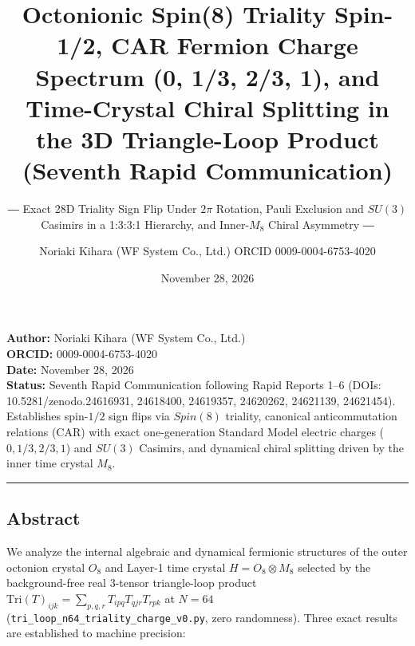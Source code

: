 \documentclass[
  a4paper,
]{article}
\title{Octonionic Spin(8) Triality Spin-1/2, CAR Fermion Charge Spectrum
(0, 1/3, 2/3, 1), and Time-Crystal Chiral Splitting in the 3D
Triangle-Loop Product (Seventh Rapid Communication)}
\subtitle{― Exact 28D Triality Sign Flip Under \(2\pi\) Rotation, Pauli
Exclusion and \(SU(3)\) Casimirs in a 1:3:3:1 Hierarchy, and
Inner-\(M_8\) Chiral Asymmetry ―}
\author{Noriaki Kihara (WF System Co., Ltd.) ORCID 0009-0004-6753-4020}
\date{November 28, 2026}
\begin{document}
\maketitle

\textbf{Author:} Noriaki Kihara (WF System Co., Ltd.)\\
\textbf{ORCID:} 0009-0004-6753-4020\\
\textbf{Date:} November 28, 2026\\
\textbf{Status:} Seventh Rapid Communication following Rapid Reports
1--6 (DOIs: 10.5281/zenodo.24616931, 24618400, 24619357, 24620262,
24621139, 24621454). Establishes spin-\(1/2\) sign flips via \(Spin(8)\)
triality, canonical anticommutation relations (CAR) with exact
one-generation Standard Model electric charges (\(0, 1/3, 2/3, 1\)) and
\(SU(3)\) Casimirs, and dynamical chiral splitting driven by the inner
time crystal \(M_8\).

\begin{center}\rule{0.5\linewidth}{0.5pt}\end{center}

\subsection{Abstract}\label{abstract}

We analyze the internal algebraic and dynamical fermionic structures of
the outer octonion crystal \(O_8\) and Layer-1 time crystal
\(H = O_8 \otimes M_8\) selected by the background-free real 3-tensor
triangle-loop product
\(\mathrm{Tri}(T)_{ijk} = \sum_{p,q,r} T_{ipq} T_{qjr} T_{rpk}\) at
\(N = 64\) (\texttt{tri\_loop\_n64\_triality\_charge\_v0.py}, zero
randomness). Three exact results are established to machine precision:
\end{document}
